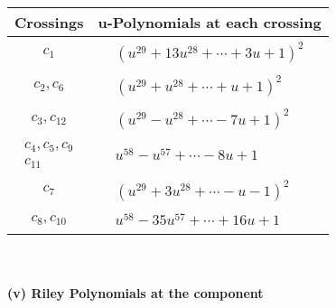 \documentclass[1p]{elsarticle_modified}
\theoremstyle{definition}
\begin{document}
\begin{tabular}{m{50pt}|m{274pt}}
Crossings & \hspace{64pt}u-Polynomials at each crossing \\
\hline $$\begin{aligned}c_{1}\end{aligned}$$&$\begin{aligned}
&(u^{29}+13 u^{28}+\cdots+3 u+1)^{2}
\end{aligned}$\\
\hline $$\begin{aligned}c_{2},c_{6}\end{aligned}$$&$\begin{aligned}
&(u^{29}+u^{28}+\cdots+u+1)^{2}
\end{aligned}$\\
\hline $$\begin{aligned}c_{3},c_{12}\end{aligned}$$&$\begin{aligned}
&(u^{29}- u^{28}+\cdots-7 u+1)^{2}
\end{aligned}$\\
\hline $$\begin{aligned}c_{4},c_{5},c_{9}\\c_{11}\end{aligned}$$&$\begin{aligned}
&u^{58}- u^{57}+\cdots-8 u+1
\end{aligned}$\\
\hline $$\begin{aligned}c_{7}\end{aligned}$$&$\begin{aligned}
&(u^{29}+3 u^{28}+\cdots- u-1)^{2}
\end{aligned}$\\
\hline $$\begin{aligned}c_{8},c_{10}\end{aligned}$$&$\begin{aligned}
&u^{58}-35 u^{57}+\cdots+16 u+1
\end{aligned}$\\
\hline
\end{tabular}\\~\\
\newpage\renewcommand{\arraystretch}{1}
\flushleft \textbf{(v) Riley Polynomials at the component}\newline \\
\end{document}
